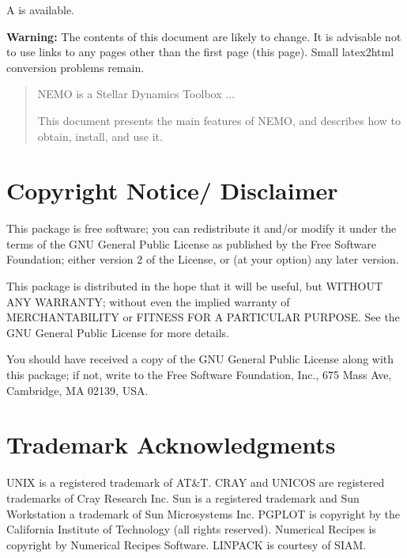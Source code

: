 \setlength{\parindent}{0pt}
\setlength{\parskip}{2.5mm}
\maketitle
\begin{htmlonly}
A 
is available. 

{\bf Warning:} The contents of this document are likely to change.
It is advisable not to use links to any pages other than the first
page (this page). Small latex2html conversion problems remain.
\end{htmlonly}

\begin{abstract} 
NEMO is a Stellar Dynamics Toolbox ...

This document presents the main features of NEMO, and
describes how to obtain, install, and use it.
\end{abstract}


\pagestyle{empty}
\newpage

\small
\section*{Copyright Notice/ Disclaimer}

This package is free software; you can redistribute it and/or modify
it under the terms of the GNU General Public License as published by
the Free Software Foundation; either version 2 of the License, or
(at your option) any later version.

This package is distributed in the hope that it will be useful,
but WITHOUT ANY WARRANTY; without even the implied warranty of
MERCHANTABILITY or FITNESS FOR A PARTICULAR PURPOSE.  See the
GNU General Public License for more details.

You should have received a copy of the GNU General Public License
along with this package; if not, write to the Free Software
Foundation, Inc., 675 Mass Ave, Cambridge, MA 02139, USA.


\section*{Trademark Acknowledgments}
UNIX is a registered trademark of AT\&T.
CRAY and UNICOS are registered trademarks of Cray Research Inc.
Sun is a registered trademark and Sun Workstation a trademark of Sun
Microsystems Inc.
PGPLOT is copyright by the California Institute of Technology (all
rights reserved).
Numerical Recipes is copyright by Numerical Recipes Software.
LINPACK is courtesy of SIAM.


